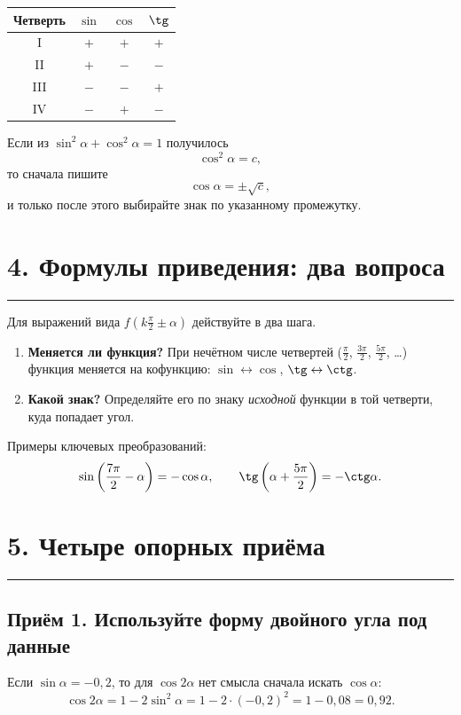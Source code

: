 \documentclass[a4paper,12pt]{article}
\newcommand{\sectionline}{\vspace{-1mm}\noindent\color{accent}\rule{\linewidth}{0.7pt}\color{textgray}\vspace{2mm}}
\newcommand{\key}[1]{\textbf{\color{darkaccent}#1}}
\begin{document}
\begin{center}
\begin{tabular}{@{}c c c c@{}}
\toprule
Четверть & $\sin$ & $\cos$ & $\tg$ \\
\midrule
I & $+$ & $+$ & $+$ \\
II & $+$ & $-$ & $-$ \\
III & $-$ & $-$ & $+$ \\
IV & $-$ & $+$ & $-$ \\
\bottomrule
\end{tabular}
\end{center}

Если из $\sin^2\alpha+\cos^2\alpha=1$ получилось
\[
\cos^2\alpha=c,
\]
то сначала пишите
\[
\cos\alpha=\pm\sqrt{c},
\]
и только после этого выбирайте знак по указанному промежутку.

\clearpage

\section*{4. Формулы приведения: два вопроса}
\sectionline

Для выражений вида $f\!\left(k\frac{\pi}{2}\pm\alpha\right)$ действуйте в два шага.

\begin{enumerate}
  \item \key{Меняется ли функция?} При нечётном числе четвертей ($\frac{\pi}{2}$, $\frac{3\pi}{2}$, $\frac{5\pi}{2}$, \dots) функция меняется на кофункцию: $\sin\leftrightarrow\cos$, $\tg\leftrightarrow\ctg$.
  \item \key{Какой знак?} Определяйте его по знаку \emph{исходной} функции в той четверти, куда попадает угол.
\end{enumerate}

Примеры ключевых преобразований:
\[
\sin\left(\frac{7\pi}{2}-\alpha\right)=-\cos\alpha,
\qquad
\tg\left(\alpha+\frac{5\pi}{2}\right)=-\ctg\alpha.
\]

\section*{5. Четыре опорных приёма}
\sectionline

\subsection*{Приём 1. Используйте форму двойного угла под данные}
Если $\sin\alpha=-0{,}2$, то для $\cos 2\alpha$ нет смысла сначала искать $\cos\alpha$:
\[
\cos 2\alpha=1-2\sin^2\alpha
=1-2\cdot(-0{,}2)^2
=1-0{,}08=0{,}92.
\]
\end{document}
